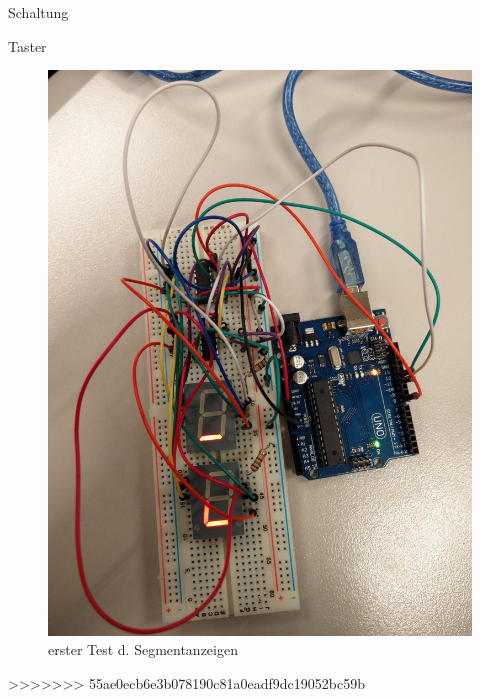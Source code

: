 \documentclass[mathserif,9pt]{article}
\begin{document}
\begin{frame}{Schaltung}
\begin{block}{Taster}
\begin{minipage}[c]{0.3\textwidth}
\begin{figure}
                    \includegraphics[width=\textwidth]{img/breadboard.jpg}
                    \caption{erster Test d. Segmentanzeigen}
                    \label{fig:breadboard}
               \end{figure}
            \end{minipage}
>>>>>>> 55ae0ecb6e3b078190c81a0eadf9dc19052bc59b
        \end{block}
    \end{frame}
\end{document}
